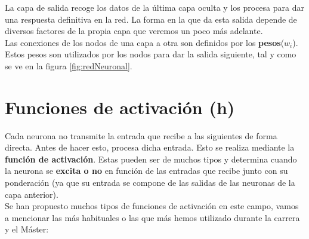 \documentclass[11pt,fleqn]{book} %
\begin{document}
La capa de salida recoge los datos de la última capa oculta y los procesa para dar una respuesta definitiva en la red. La forma en la que da esta salida depende de diversos factores de la propia capa que veremos un poco más adelante. \\

Las conexiones de los nodos de una capa a otra son definidos por los \textbf{pesos}($w_i$). Estos pesos son utilizados por los nodos para dar la salida siguiente, tal y como se ve en la figura \ref{fig:redNeuronal}.

\section{Funciones de activación (h)}\label{sec:activacion}

Cada neurona no transmite la entrada que recibe a las siguientes de forma directa. Antes de hacer esto, procesa dicha entrada. Esto se realiza mediante la \textbf{función de activación}. Estas pueden ser de muchos tipos y determina cuando la neurona se \textbf{excita o no} en función de las entradas que recibe junto con su ponderación (ya que su entrada se compone de las salidas de las neuronas de la capa anterior)\cite{article:redNeuronal2}. \\

Se han propuesto muchos tipos de funciones de activación en este campo, vamos a mencionar las más habituales o las que más hemos utilizado durante la carrera y el Máster: \\
\end{document}
